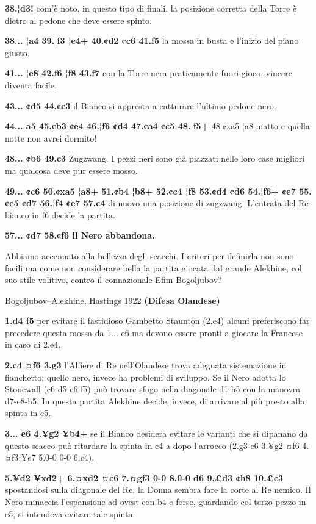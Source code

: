 
\textbf{38.¦d3!} com'è noto, in questo tipo di finali, la posizione
corretta della Torre è dietro al pedone che deve essere spinto.

\textbf{38... ¦a4 39.¦f3 ¦e4+ 40.¢d2 ¢c6 41.f5} la mossa in busta e
l'inizio del piano giusto.

\textbf{41... ¦e8 42.f6 ¦f8 43.f7} con la Torre nera praticamente fuori
gioco, vincere diventa facile.

\textbf{43... ¢d5 44.¢c3} il Bianco si appresta a catturare l'ultimo
pedone nero.

\textbf{44... a5 45.¢b3 ¢e4 46.¦f6 ¢d4 47.¢a4 ¢c5 48.¦f5+} 48.¢xa5 ¦a8
matto e quella notte non avrei dormito!

\textbf{48... ¢b6 49.c3} Zugzwang. I pezzi neri sono già piazzati nelle
loro case migliori ma qualcosa deve pur essere mosso.

\textbf{49... ¢c6 50.¢xa5 ¦a8+ 51.¢b4 ¦b8+ 52.¢c4 ¦f8 53.¢d4 ¢d6 54.¦f6+
¢e7 55.¢e5 ¢d7 56.¦f4 ¢e7 57.c4} di nuovo una posizione di zugzwang.
L'entrata del Re bianco in f6 decide la partita.

\textbf{57... ¢d7 58.¢f6 il Nero abbandona.}

Abbiamo accennato alla bellezza degli scacchi. I criteri per definirla
non sono facili ma come non considerare bella la partita giocata dal
grande Alekhine, col suo stile volitivo, contro il connazionale Efim
Bogoljubov?

Bogoljubov--Alekhine, Hastings 1922 \textbf{(Difesa Olandese)}

\textbf{1.d4 f5} per evitare il fastidioso Gambetto Staunton (2.e4)
alcuni preferiscono far precedere questa mossa da 1... e6 ma devono
essere pronti a giocare la Francese in caso di 2.e4.

\textbf{2.c4 ¤f6 3.g3} l'Alfiere di Re nell'Olandese trova adeguata
sistemazione in fianchetto; quello nero, invece ha problemi di sviluppo.
Se il Nero adotta lo Stonewall (c6-d5-e6-f5) può trovare sfogo nella
diagonale d1-h5 con la manovra d7-e8-h5. In questa partita Alekhine
decide, invece, di arrivare al più presto alla spinta in e5.

\textbf{3... e6 4.¥g2 ¥b4+} se il Bianco desidera evitare le varianti
che si dipanano da questo scacco può ritardare la spinta in c4 a dopo
l'arrocco (2.g3 e6 3.¥g2 ¤f6 4.¤f3 ¥e7 5.0-0 0-0 6.c4).

\textbf{5.¥d2 ¥xd2+ 6.¤xd2 ¤c6 7.¤gf3 0-0 8.0-0 d6 9.£d3 ¢h8 10.£c3}
spostandosi sulla diagonale del Re, la Donna sembra fare la corte al Re
nemico. Il Nero minaccia l'espansione ad ovest con b4 e forse, guardando
col terzo pezzo in e5, si intendeva evitare tale spinta.

